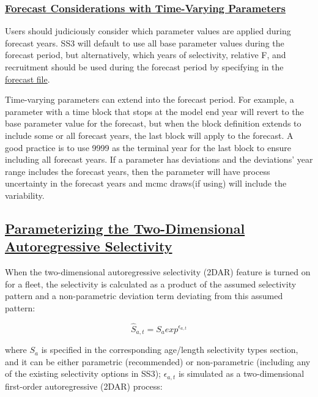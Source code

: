 \hypertarget{ForecastTV}{}
\subsubsection[Forecast Considerations with Time-Varying Parameters]{\protect\hyperlink{ForecastTV}{Forecast Considerations with Time-Varying Parameters}}

Users should judiciously consider which parameter values are applied during forecast years. SS3 will default to use all base parameter values during the forecast period, but alternatively, which years of selectivity, relative F, and recruitment should be used during the forecast period by specifying in the \hyperlink{fore-specify}{forecast file}.

Time-varying parameters can extend into the forecast period. For example, a parameter with a time block that stops at the model end year will revert to the base parameter value for the forecast, but when the block definition extends to include some or all forecast years, the last block will apply to the forecast. A good practice is to use 9999 as the terminal year for the last block to ensure including all forecast years. If a parameter has deviations and the deviations' year range includes the forecast years, then the parameter will have process uncertainty in the forecast years and \gls{mcmc} draws(if using) will include the variability.


\hypertarget{2DAR}{}
\subsection[Parameterizing the Two-Dimensional Autoregressive Selectivity]{\protect\hyperlink{2DAR}{Parameterizing the Two-Dimensional Autoregressive Selectivity}}
When the two-dimensional autoregressive selectivity (2DAR) feature is turned on for a fleet, the selectivity is calculated as a product of the assumed selectivity pattern and a non-parametric deviation term deviating from this assumed pattern:

\begin{equation}
\hat{S}_{a,t} = S_aexp^{\epsilon_{a,t}}
\end{equation}

where $S_a$ is specified in the corresponding age/length selectivity types section, and it can be either parametric (recommended) or non-parametric (including any of the existing selectivity options in SS3); $\epsilon_{a,t}$ is simulated as a two-dimensional first-order autoregressive (2DAR) process:

